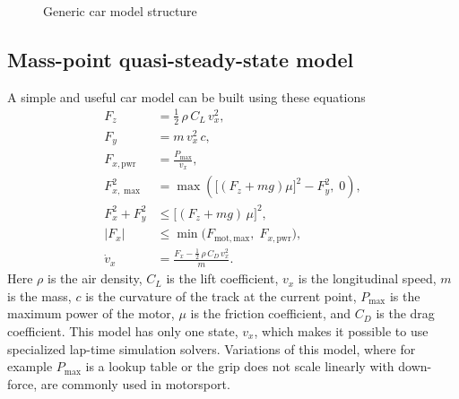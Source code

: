 \begin{figure}[H]
	\centering
	\caption{Generic car model structure}
	\label{fig:generic_car}
\end{figure}


\subsection{Mass-point quasi-steady-state model}
A simple and useful car model can be built using these equations
\begin{align}
    F_z &= \tfrac{1}{2}\, \rho\, C_L\, v_x^2, \\
    F_y &= m\, v_x^2\, c, \\
    F_{x,\mathrm{pwr}} &= \frac{P_{\max}}{v_x}, \\
    F_{x,\max}^2 &= \max\!\left( \bigl[(F_z + m g)\mu\bigr]^2 - F_y^2,\; 0 \right), \\
    F_x^2 + F_y^2 &\le \bigl[(F_z + m g)\, \mu\bigr]^2, \\
    |F_x| &\le \min\!\bigl(F_{\mathrm{mot,max}},\; F_{x,\mathrm{pwr}}\bigr), \\
    \dot{v}_x &= \frac{F_x - \tfrac{1}{2}\, \rho\, C_D\, v_x^2}{m}.
    \label{QSS_model}
\end{align}
Here $\rho$ is the air density, $C_L$ is the lift coefficient, $v_x$ is the longitudinal speed, $m$ is the mass, $c$ is the curvature of the track at the current point, $P_{\max}$ is the maximum power of the motor, $\mu$ is the friction coefficient, and $C_D$ is the drag coefficient. This model has only one state, $v_x$, which makes it possible to use specialized lap-time simulation solvers. Variations of this model, where for example $P_{\max}$ is a lookup table or the grip does not scale linearly with down-force, are commonly used in motorsport.
